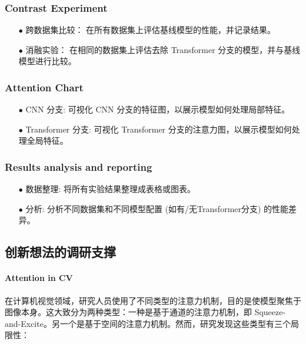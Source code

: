 \documentclass[a4paper]{ctexart}
\begin{document}
	\subsubsection{Contrast Experiment}
	
	\begin{itemize}
		\item[$\bullet$]
		跨数据集比较： 在所有数据集上评估基线模型的性能，并记录结果。
		\item[$\bullet$]
		消融实验： 在相同的数据集上评估去除 Transformer 分支的模型，并与基线模型进行比较。
	\end{itemize}
	
	\subsubsection{Attention Chart}
	
	\begin{itemize}
		\item[$\bullet$]
		CNN 分支: 可视化 CNN 分支的特征图，以展示模型如何处理局部特征。
		\item[$\bullet$]
		Transformer 分支: 可视化 Transformer 分支的注意力图，以展示模型如何处理全局特征。
	\end{itemize}
	
	\subsubsection{Results analysis and reporting}
	
	\begin{itemize}
		\item[$\bullet$]
		数据整理: 将所有实验结果整理成表格或图表。
		\item[$\bullet$]
		分析: 分析不同数据集和不同模型配置 (如有/无Transformer分支) 的性能差异。
	\end{itemize}
	
	\subsection{创新想法的调研支撑}
	
	\paragraph{Attention in CV}
	
	在计算机视觉领域，研究人员使用了不同类型的注意力机制，目的是使模型聚焦于图像本身。这大致分为两种类型：一种是基于通道的注意力机制，即 Squeeze-and-Excite。另一个是基于空间的注意力机制\cite{woo2018cbam}。然而，研究发现这些类型有三个局限性：
	
\end{document}

